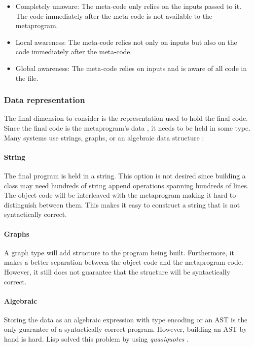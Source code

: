 \begin{itemize}
	\item Completely unaware: The meta-code only relies on the inputs passed to it.
	      The code immediately after the meta-code is not available to the metaprogram.
	\item Local awareness: The meta-code relies not only on inputs but also on the code immediately after the meta-code.
	\item Global awareness: The meta-code relies on inputs and is aware of all code in the file.
\end{itemize}

\subsubsection{Data representation}
The final dimension to consider is the representation used to hold the final code.
Since the final code is the metaprogram's data \cite{bawden_99_01}, it needs to be held in some type.
Many systems use strings, graphs, or an algebraic data structure \cite{sheard_01_01}:

\paragraph{String}
The final program is held in a string.
This option is not desired since building a class may need hundreds of string append operations spanning hundreds of lines.
The object code will be interleaved with the metaprogram making it hard to distinguish between them.
This makes it easy to construct a string that is not syntactically correct.

\paragraph{Graphs}
A graph type will add structure to the program being built.
Furthermore, it makes a better separation between the object code and the metaprogram code.
However, it still does not guarantee that the structure will be syntactically correct.

\paragraph{Algebraic}
Storing the data as an algebraic expression with type encoding or an AST is the only guarantee of a syntactically correct program.
However, building an AST by hand is hard.
Lisp solved this problem by using \textit{quasiquotes} \cite{bawden_99_01}.

